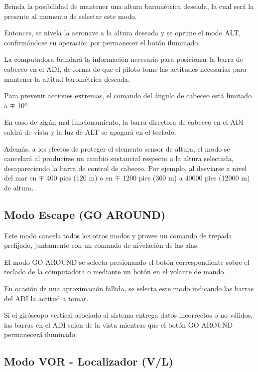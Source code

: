 \documentclass[a4paper,12pt,twoside]{article}
\begin{document}
Brinda la posibilidad de mantener una altura barom\'etrica deseada,
la cual ser\'a la presente al momento de selectar este modo.

Entonces, se nivela la aeronave a la altura deseada y se oprime
el modo ALT, confirm\'andose su operaci\'on por permanecer el 
bot\'on iluminado.

La computadora brindar\'a la informaci\'on necesaria para
posicionar la barra de cabeceo en el ADI, de forma de 
que el piloto tome las actitudes necesarias para mantener
la altitud barom\'etrica deseada.

Para prevenir acciones extremas, el comando del \'angulo de
cabeceo est\'a limitado a $\mp$ 10º.

En caso de alg\'un mal funcionamiento, la barra directora
de cabeceo en el ADI saldr\'a de vista y la luz de ALT
se apagar\'a en el teclado.

Adem\'as, a los efectos de proteger el elemento sensor de altura,
el modo se cancelar\'a al producirse un cambio sustancial respecto
a la altura selectada, desapareciendo la barra de control
de cabeceo.
Por ejemplo, al desviarse a nivel del mar en $\mp$ 400 pies (120 m)
o en $\mp$ 1200 pies (360 m) a 40000 pies (12000 m) de altura. 


\subsection{Modo Escape (GO AROUND)}
\label{sec:go.araund}

Este modo cancela todos los otros modos y provee un comando de trepada
prefijado, juntamente con un comando de nivelaci\'on de las alas.

El modo GO AROUND se selecta presionando el bot\'on correspondiente
sobre el teclado de la computadora o mediante un bot\'on en el
volante de mando.

En ocasi\'on de una aproximaci\'on fallida, se selecta este modo
indicando las barras del ADI la actitud a tomar.

Si el gir\'oscopo vertical asociado al sistema entrega datos
incorrectos o no v\'alidos, las barras en el ADI salen de
la vista mientras que el bot\'on GO AROUND permanecer\'a iluminado.


\subsection{Modo VOR - Localizador (V/L)} \\
\label{sec:V_L}
\end{document}
